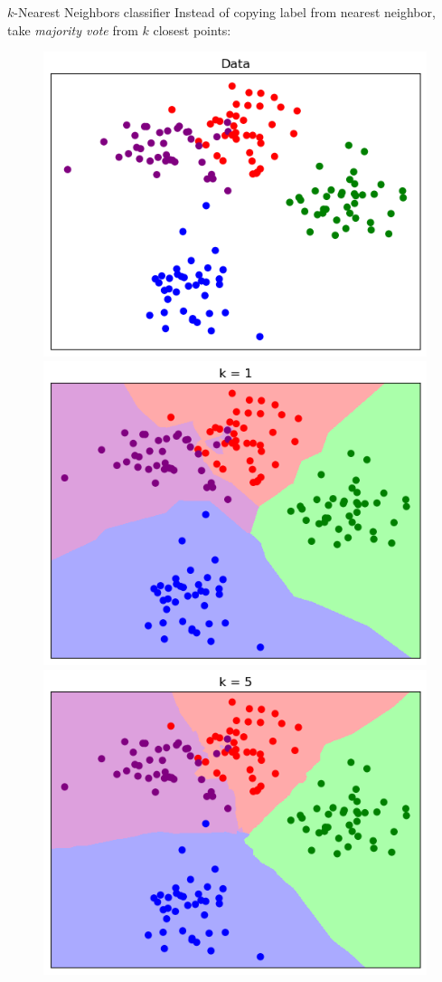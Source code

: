 \documentclass[dvipsnames]{beamer}
\begin{document}
\begin{frame}{$k$-Nearest Neighbors classifier}
Instead of copying label from nearest neighbor, take \emph{majority vote} from $k$ closest points: \pause
\begin{figure}
\includegraphics[scale=.33]{figures/k_nn_data.png}
\includegraphics[scale=.33]{figures/k_nn_boundary_k1.png}
\includegraphics[scale=.33]{figures/k_nn_boundary_k5.png}

\end{figure}
\end{frame}
\end{document}

